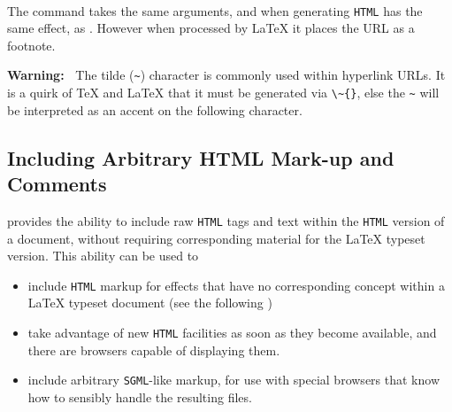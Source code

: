 %
%
\paragraph*{\label{addfootlink}}
The  command takes the same arguments,
and when generating \texttt{HTML} has the same effect, 
as .
However when processed by \LaTeX{} it places the URL as a footnote.

\medskip\htmlrule
{}\html{\\}\noindent
\textbf{Warning:~}
The tilde (\texttt{\~{}}) character is commonly used within hyperlink URLs. 
It is a quirk of \TeX{} and \LaTeX{} that it must be generated via \verb|\~{}|,
else the \texttt{\~{}} will be interpreted as an accent on the following character.


\subsection{Including Arbitrary HTML Mark-up and Comments\label{sec:markup}}%
\tableofchildlinks*
{}%
%
\html{\\}%
\latextohtml{} provides the ability to include raw \texttt{HTML} tags
and text within the \texttt{HTML} version of a document, without
requiring corresponding material for the \LaTeX{} typeset version.
This ability can be used to 
\begin{itemize}
\item
include \texttt{HTML} markup for effects that have no corresponding concept
within a \LaTeX{} typeset document (see the following )
\item
take advantage of new \texttt{HTML} facilities as soon as they become available,
and there are browsers capable of displaying them.
\item
include arbitrary \texttt{SGML}-like markup, for use with special browsers 
that know how to sensibly handle the resulting files.
\end{itemize}

